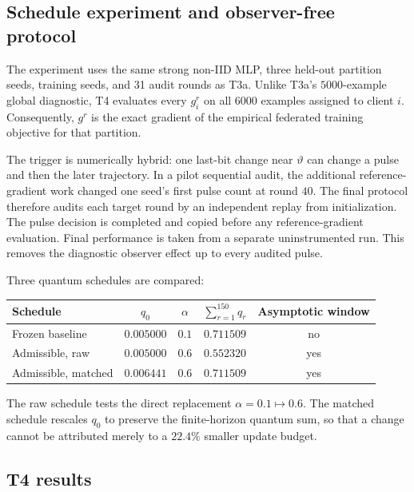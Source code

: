 \subsection{Schedule experiment and observer-free protocol}

The experiment uses the same strong non-IID MLP, three held-out partition
seeds, training seeds, and 31 audit rounds as T3a.  Unlike T3a's
$5000$-example global diagnostic, T4 evaluates every $g_i^r$ on all $6000$
examples assigned to client $i$.  Consequently, $g^r$ is the exact gradient of
the empirical federated training objective for that partition.

The trigger is numerically hybrid: one last-bit change near $\vartheta$ can
change a pulse and then the later trajectory.  In a pilot sequential audit,
the additional reference-gradient work changed one seed's first pulse count at
round $40$.  The final protocol therefore audits each target round by an
independent replay from initialization.  The pulse decision is completed and
copied before any reference-gradient evaluation.  Final performance is taken
from a separate uninstrumented run.  This removes the diagnostic observer
effect up to every audited pulse.

Three quantum schedules are compared:
\begin{center}
\begin{tabular}{lcccc}
\toprule
Schedule & $q_0$ & $\alpha$ & $\sum_{r=1}^{150}q_r$ & Asymptotic window\\
\midrule
Frozen baseline & $0.005000$ & $0.1$ & $0.711509$ & no\\
Admissible, raw & $0.005000$ & $0.6$ & $0.552320$ & yes\\
Admissible, matched & $0.006441$ & $0.6$ & $0.711509$ & yes\\
\bottomrule
\end{tabular}
\end{center}
The raw schedule tests the direct replacement $\alpha=0.1\mapsto0.6$.  The
matched schedule rescales $q_0$ to preserve the finite-horizon quantum sum, so
that a change cannot be attributed merely to a $22.4\%$ smaller update budget.

\subsection{T4 results}

